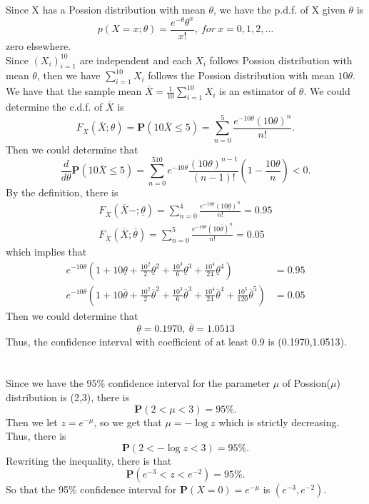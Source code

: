 \documentclass[10.5pt]{article}
\begin{document}
\section{}
Since X has a Possion distribution with mean $\theta$, we have the p.d.f. of X given $\theta$ is $$p(X=x;\theta)=\frac{e^{-\theta}\theta^x}{x!},~for ~x=0,1,2,\dots$$\indent
zero elsewhere.\\\indent
Since $(X_i)_{i=1}^{10}$ are independent and each $X_i$ follows Possion distribution with mean $\theta$, then we have $\sum_{i=1}^{10}X_i$ follows the Possion distribution with mean $10\theta$.\\\indent
We have that the sample mean $\overline{X}=\frac{1}{10}\sum_{i=1}^{10}X_i$ is an estimator of $\theta$. We could determine the c.d.f. of $\overline{X}$ is $$F_{\overline{X}}(\overline{X};\theta)=\mathbf{P}(10\overline{X}\leqslant 5)=\sum_{n=0}^{5}\frac{e^{-10\theta}(10\theta)^n}{n!}.$$\indent
Then we could determine that $$\frac{d}{d\theta}\mathbf{P}(10\overline{X}\leqslant 5)=\sum_{n=0}^510e^{-10\theta}\frac{(10\theta)^{n-1}}{(n-1)!}(1-\frac{10\theta}{n})<0.$$\indent
By the definition, there is 
$$\begin{aligned}
    F_{\overline{X}}(\overline{X}-;\underline{\theta})=\sum_{n=0}^{4}\frac{e^{-10\underline{\theta}}(10\underline{\theta})^n}{n!}=0.95\\
    F_{\overline{X}}(\overline{X};\overline{\theta})=\sum_{n=0}^{5}\frac{e^{-10\overline{\theta}}(10\overline{\theta})^n}{n!}=0.05
\end{aligned}$$\indent
which implies that $$\begin{aligned}
    e^{-10\underline{\theta}}\left(1+10\underline{\theta}+\frac{10^2}{2}\underline{\theta}^2+\frac{10^3}{6}\underline{\theta}^3+\frac{10^4}{24}\underline{\theta}^4\right)&=0.95\\
    e^{-10\overline{\theta}}\left(1+10\overline{\theta}+\frac{10^2}{2}\overline{\theta}^2+\frac{10^3}{6}\overline{\theta}^3+\frac{10^4}{24}\overline{\theta}^4+\frac{10^5}{120}\overline{\theta}^5\right)&=0.05
\end{aligned}$$\indent
Then we could determine that $$\underline{\theta}=0.1970,~\overline{\theta}=1.0513$$\indent
Thus, the confidence interval with coefficient of at least 0.9 is (0.1970,1.0513).

\section{}
Since we have the 95\% confidence interval for the parameter $\mu$ of Possion($\mu$) distribution is (2,3), there is $$\mathbf{P}(2<\mu<3)=95\%.$$\indent
Then we let $z=e^{-\mu}$, so we get that $\mu=-\log z$ which is strictly decreasing. Thus, there is $$\mathbf{P}(2<-\log z<3)=95\%.$$\indent
Rewriting the inequality, there is that $$\mathbf{P}(e^{-3}<z<e^{-2})=95\%.$$\indent
So that the 95\% confidence interval for $\mathbf{P}(X=0)=e^{-\mu}$ is $(e^{-3},e^{-2})$.
\end{document}
